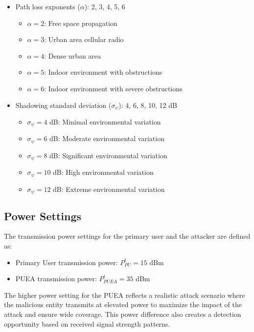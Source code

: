 \begin{itemize}
    \item Path loss exponents ($\alpha$): 2, 3, 4, 5, 6
    \begin{itemize}
        \item $\alpha = 2$: Free space propagation
        \item $\alpha = 3$: Urban area cellular radio
        \item $\alpha = 4$: Dense urban area
        \item $\alpha = 5$: Indoor environment with obstructions
        \item $\alpha = 6$: Indoor environment with severe obstructions
    \end{itemize}
    
    \item Shadowing standard deviation ($\sigma_{\psi}$): 4, 6, 8, 10, 12 dB
    \begin{itemize}
        \item $\sigma_{\psi} = 4$ dB: Minimal environmental variation
        \item $\sigma_{\psi} = 6$ dB: Moderate environmental variation
        \item $\sigma_{\psi} = 8$ dB: Significant environmental variation
        \item $\sigma_{\psi} = 10$ dB: High environmental variation
        \item $\sigma_{\psi} = 12$ dB: Extreme environmental variation
    \end{itemize}
\end{itemize}

\subsection{Power Settings}

The transmission power settings for the primary user and the attacker are defined as:

\begin{itemize}
    \item Primary User transmission power: $P_{PU}^t = 15$ dBm
    \item PUEA transmission power: $P_{PUEA}^t = 35$ dBm
\end{itemize}

The higher power setting for the PUEA reflects a realistic attack scenario where the malicious entity transmits at elevated power to maximize the impact of the attack and ensure wide coverage. This power difference also creates a detection opportunity based on received signal strength patterns.

